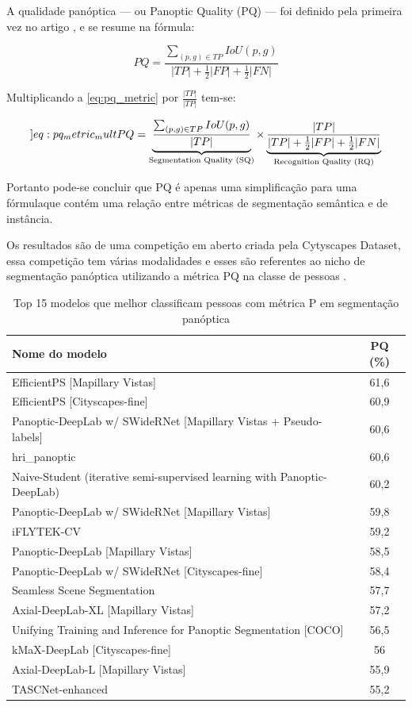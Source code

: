 A qualidade panóptica — ou Panoptic Quality (PQ) — foi definido pela primeira vez no artigo \space{}, e se resume na fórmula:

\begin{equation}
\label{eq:pq_metric}
PQ = \frac{\sum_{(p,g)\in TP}IoU(p,g)}{ |TP| + \frac{1}{2}|FP| + \frac{1}{2}|FN|}
\end{equation}

Multiplicando a \cref{eq:pq_metric} por $\frac{|TP|}{|TP|}$ tem-se:

\begin{equation}
	\label[]{eq:pq_metric_mult}
	PQ = \underbrace{\frac{\sum_{(p,g)\in TP}IoU(p,g)}{|TP|}}_{\text{Segmentation Quality (SQ)}} 
	\times
	\underbrace{\frac{|TP|}{|TP| + \frac{1}{2}|FP| + \frac{1}{2}|FN|}}_{\text{Recognition Quality (RQ)}}
\end{equation}

Portanto pode-se concluir que PQ é apenas uma simplificação para uma fórmulaque contém uma relação entre métricas de segmentação semântica e de instância.


Os resultados são de uma competição em aberto criada pela Cytyscapes Dataset, essa competição tem várias modalidades e esses são referentes ao nicho de segmentação panóptica utilizando a métrica PQ na classe de pessoas \space\cite{datasetResults}.
\begin{table}[H]
	\centering
	\caption{Top 15 modelos que melhor classificam pessoas com métrica P em segmentação panóptica}
	\label{tab:resultados-cityscapes}
	\begin{tabular}{|l|c|}
	  \hline
	  Nome do modelo & PQ (\%) \\
	  \hline
	  EfficientPS [Mapillary Vistas] & 61,6 \\
	  EfficientPS [Cityscapes-fine] & 60,9 \\
	  Panoptic-DeepLab w/ SWideRNet [Mapillary Vistas + Pseudo-labels] & 60,6 \\
	  hri\_panoptic & 60,6 \\
	  Naive-Student (iterative semi-supervised learning with Panoptic-DeepLab) & 60,2 \\
	  Panoptic-DeepLab w/ SWideRNet [Mapillary Vistas] & 59,8 \\
	  iFLYTEK-CV & 59,2 \\
	  Panoptic-DeepLab [Mapillary Vistas] & 58,5 \\
	  Panoptic-DeepLab w/ SWideRNet [Cityscapes-fine] & 58,4 \\
	  Seamless Scene Segmentation & 57,7 \\
	  Axial-DeepLab-XL [Mapillary Vistas] & 57,2 \\
	  Unifying Training and Inference for Panoptic Segmentation [COCO] & 56,5 \\
	  kMaX-DeepLab [Cityscapes-fine] & 56 \\
	  Axial-DeepLab-L [Mapillary Vistas] & 55,9 \\
	  TASCNet-enhanced & 55,2 \\
	  \hline
	\end{tabular}
  \end{table}
  
  

